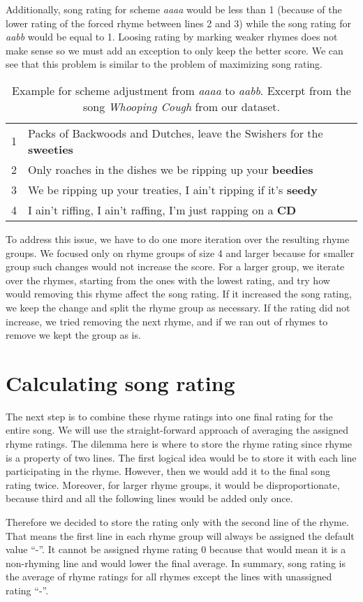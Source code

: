 Additionally, song rating for scheme \textit{aaaa} would be less than 1 (because of the lower rating of the forced rhyme between lines 2 and 3) while the song rating for \textit{aabb} would be equal to 1. Loosing rating by marking weaker rhymes does not make sense so we must add an exception to only keep the better score. We can see that this problem is similar to the problem of maximizing song rating. 

\begin{table}
	\begin{tabular}{l l}
		1&Packs of Backwoods and Dutches, leave the Swishers for the \textbf{sweeties}  \\
		2&Only roaches in the dishes we be ripping up your \textbf{beedies}  \\
		3&We be ripping up your treaties, I ain't ripping if it's \textbf{seedy}  \\
		4&I ain't riffing, I ain't raffing, I'm just rapping on a \textbf{CD} \\
	\end{tabular}
	\caption[Scheme adjustment example.]{Example for scheme adjustment from \textit{aaaa} to \textit{aabb}. Excerpt from the song \textit{Whooping Cough} from  our dataset.}
	\label{scheme_adjustment}
\end{table}

To address this issue, we have to do one more iteration over the resulting rhyme groups. We focused only on rhyme groups of size 4 and larger because for smaller group such changes would not increase the score. For a larger group, we iterate over the rhymes, starting from the ones with the lowest rating, and try how would removing this rhyme affect the song rating. If it increased the song rating, we keep the change and split the rhyme group as necessary. If the rating did not increase, we tried removing the next rhyme, and if we ran out of rhymes to remove we kept the group as is.

\section{Calculating song rating}
The next step is to combine these rhyme ratings into one final rating for the entire song. We will use the straight-forward approach of averaging the assigned rhyme ratings. The dilemma here is where to store the rhyme rating since rhyme is a property of two lines. The first logical idea would be to store it with each line participating in the rhyme. However, then we would add it to the final song rating twice. Moreover, for larger rhyme groups, it would be disproportionate, because third and all the following lines would be added only once. 

Therefore we decided to store the rating only with the second line of the rhyme. That means the first line in each rhyme group will always be assigned the default value ``-''. It cannot be assigned rhyme rating 0 because that would mean it is a non-rhyming line and would lower the final average. In summary, song rating is the average of rhyme ratings for all rhymes except the lines with unassigned rating ``-''.
